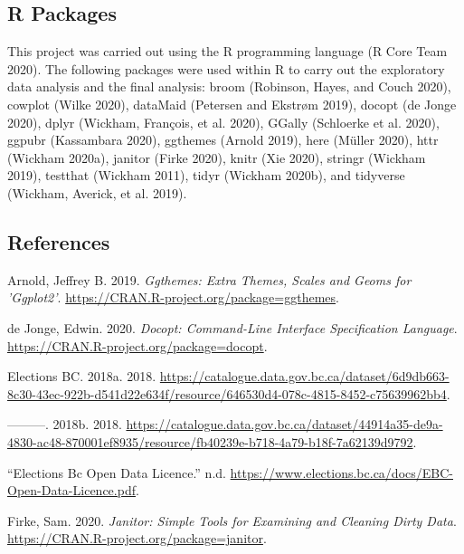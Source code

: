\documentclass[
]{article}
\begin{document}
\hypertarget{r-packages}{%
\subsection{R Packages}\label{r-packages}}

This project was carried out using the R programming language (R Core
Team 2020). The following packages were used within R to carry out the
exploratory data analysis and the final analysis: broom (Robinson,
Hayes, and Couch 2020), cowplot (Wilke 2020), dataMaid (Petersen and
Ekstrøm 2019), docopt (de Jonge 2020), dplyr (Wickham, François, et al.
2020), GGally (Schloerke et al. 2020), ggpubr (Kassambara 2020),
ggthemes (Arnold 2019), here (Müller 2020), httr (Wickham 2020a),
janitor (Firke 2020), knitr (Xie 2020), stringr (Wickham 2019), testthat
(Wickham 2011), tidyr (Wickham 2020b), and tidyverse (Wickham, Averick,
et al. 2019).

\hypertarget{references}{%
\subsection*{References}\label{references}}

\hypertarget{refs}{}
\leavevmode\hypertarget{ref-ggthemes}{}%
Arnold, Jeffrey B. 2019. \emph{Ggthemes: Extra Themes, Scales and Geoms
for 'Ggplot2'}. \url{https://CRAN.R-project.org/package=ggthemes}.

\leavevmode\hypertarget{ref-docopt}{}%
de Jonge, Edwin. 2020. \emph{Docopt: Command-Line Interface
Specification Language}.
\url{https://CRAN.R-project.org/package=docopt}.

\leavevmode\hypertarget{ref-pvp}{}%
Elections BC. 2018a. 2018.
\url{https://catalogue.data.gov.bc.ca/dataset/6d9db663-8c30-43ec-922b-d541d22e634f/resource/646530d4-078c-4815-8452-c75639962bb4}.

\leavevmode\hypertarget{ref-pvr}{}%
---------. 2018b. 2018.
\url{https://catalogue.data.gov.bc.ca/dataset/44914a35-de9a-4830-ac48-870001ef8935/resource/fb40239e-b718-4a79-b18f-7a62139d9792}.

\leavevmode\hypertarget{ref-BC_elections_license}{}%
``Elections Bc Open Data Licence.'' n.d.
\url{https://www.elections.bc.ca/docs/EBC-Open-Data-Licence.pdf}.

\leavevmode\hypertarget{ref-janitor}{}%
Firke, Sam. 2020. \emph{Janitor: Simple Tools for Examining and Cleaning
Dirty Data}. \url{https://CRAN.R-project.org/package=janitor}.
\end{document}
